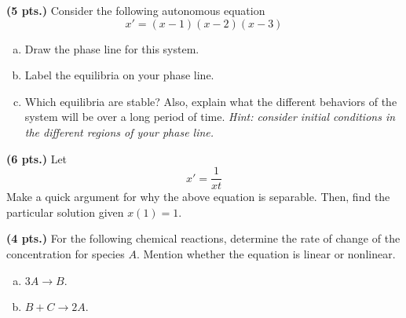 \documentclass[12pt]{amsbook}
\begin{document}
\begin{problem}
\textbf{(5 pts.)} Consider the following autonomous equation
\[
x' = (x-1)(x-2)(x-3)
\]
\begin{enumerate}[(a)]
    \item Draw the phase line for this system.
    \item Label the equilibria on your phase line.
    \item Which equilibria are stable? Also, explain what the different behaviors of the system will be over a long period of time. \emph{Hint: consider initial conditions in the different regions of your phase line.}
\end{enumerate}
\end{problem}

\newpage
\begin{problem}
\textbf{(6 pts.)} Let
\[
x' = \frac{1}{xt}
\]
Make a quick argument for why the above equation is separable.  Then, find the particular solution given $x(1)=1$.
\end{problem}

\begin{problem}
\textbf{(4 pts.)} For the following chemical reactions, determine the rate of change of the concentration for species $A$.  Mention whether the equation is linear or nonlinear.
\begin{enumerate}[(a)]
    \item $3A \to B$.
    \item $B+C \to 2A$. 
\end{enumerate}
\end{problem}
\end{document}

